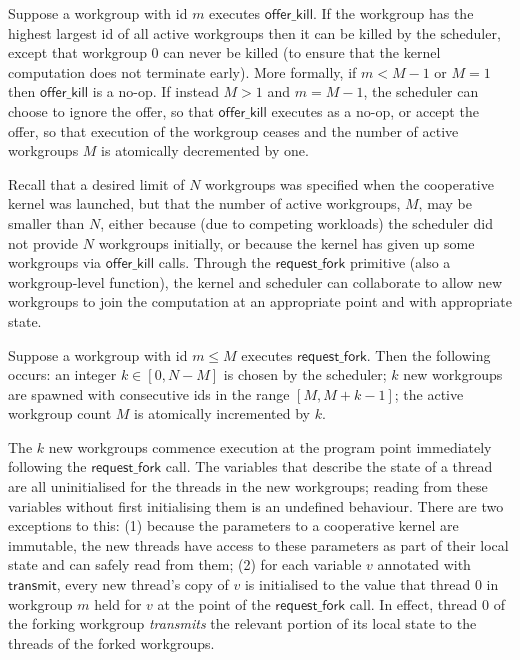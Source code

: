 \documentclass[parskip=half,sigconf,review, anonymous=true, acmcopyrightmode=none]{acmart}
\newcommand{\transmit}{\mathsf{transmit}}
\newcommand{\offerfork}{\mathsf{request\_fork}}
\newcommand{\offerkill}{\mathsf{offer\_kill}}
\begin{document}
Suppose a workgroup with id $m$ executes $\offerkill$.
If the workgroup has the highest largest id of all active workgroups then it can be killed by the scheduler, except that workgroup 0 can never be killed (to ensure that the kernel computation does not terminate early).  More formally, if $m < M-1$
or $M=1$ then $\offerkill$ is a no-op.  If instead $M > 1$ and $m =
M-1$, the scheduler can choose to ignore the offer, so that $\offerkill$
executes as a no-op, or accept the offer, so that execution of the workgroup ceases and
the number of active workgroups $M$ is atomically decremented by one.


\myparagraph{Semantics for $\offerfork$}
%
Recall that
a desired limit of $N$ workgroups was specified when the cooperative kernel was launched, but that the number of active workgroups, $M$, may be smaller
than $N$, either because (due to competing workloads) the scheduler
did not provide $N$ workgroups initially, or because the kernel has
given up some workgroups via $\offerkill$ calls.  Through the
$\offerfork$ primitive (also a workgroup-level function), the kernel and scheduler can collaborate to allow new
workgroups to join the computation at an appropriate point and with
appropriate state.

Suppose a workgroup with id $m\leq M$ executes $\offerfork$.  Then the following occurs: an
integer $k \in [0, N-M]$ is chosen by the scheduler;
$k$ new workgroups are spawned with consecutive ids in the range $[M,
  M+k-1]$; the active workgroup count $M$ is atomically incremented by $k$.

The $k$ new workgroups commence execution at the program point
immediately following the $\offerfork$ call.  The variables that
describe the state of a thread are all uninitialised for the threads
in the new workgroups; reading from these variables without first
initialising them is an undefined behaviour.  There are two exceptions
to this: (1) because the parameters to a cooperative kernel are
immutable, the new threads have access to these parameters as part of
their local state and can safely read from them; (2) for each variable
$v$ annotated with $\transmit$, every new thread's copy of $v$ is
initialised to the value that thread 0 in workgroup $m$ held for $v$
at the point of the $\offerfork$ call.
%
In effect, thread 0 of the forking workgroup \emph{transmits} the relevant
portion of its local state to the threads of the forked workgroups.
\end{document}
